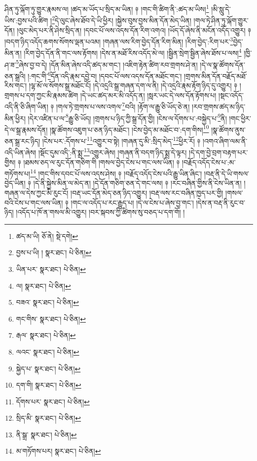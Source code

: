 ཤིན་ཏུ་ལྐོག་ཏུ་གྱུར་རྣམས་ལ། །ཚད་མ་ཡོད་པ་སྲིད་མ་ཡིན། ༈ །གང་གི་ཚིག་ནི་:ཚད་མ་ཡིས།\footnote{ཚད་མ་ཡི།  ཅོ་ནེ།  སྡེ་དགེ། } །མི་སླུ་དེ་ཡིས་:བྱས་པའི་ཚིག །\footnote{བྱས་པ་ཡི། །  སྣར་ཐང་།  པེ་ཅིན། }དེ་ལུང་ཞེས་ཐོབ་དེ་ཡི་ཕྱིར། །སྐྱེས་བུས་བྱས་མིན་དོན་མེད་ཡིན། །གལ་ཏེ་ཤིན་ཏུ་ལྐོག་གྱུར་དོན། །ལུང་མེད་པར་ནི་ཤེས་སྲིད་ན། །དབང་པོ་ལས་འདས་དོན་རིག་འགའ། །ཡོད་དོ་ཞེས་ནི་མངོན་འདོད་འགྱུར། ༈ །བདག་ཉིད་འདོད་ཆགས་སོགས་ལྡན་པའམ། །གཞན་ལས་རིག་བྱེད་དོན་རིག་མིན། །རིག་བྱེད་:རིག་པར་\footnote{ཡིན་པར་  སྣར་ཐང་།  པེ་ཅིན། }བྱེད་མིན་ན། །རིག་བྱེད་དོན་ནི་གང་ལས་རྟོགས། །དེས་ན་མཐོ་རིས་འདོད་མེ་ལ། །སྦྱིན་སྲེག་སྦྱིན་ཞེས་ཐོས་པ་ལས།\footnote{ལ།  སྣར་ཐང་།  པེ་ཅིན། } །ཁྱི་ཤ་ཟ་\footnote{བཟའ་  སྣར་ཐང་།  པེ་ཅིན། }ཞེས་བྱ་བ་དེ། །དོན་མིན་ཞེས་འདི་ཚད་མ་གང་། །འཇིག་རྟེན་ཚིག་རབ་གྲགས་ཤེ་ན། །དེ་ལ་སྣ་ཚོགས་དོན་ཅན་སྒྲའི། །:གང་གི་\footnote{གང་གིས་  སྣར་ཐང་།  པེ་ཅིན། }དོན་འདི་རྣམ་དབྱེ་བ། །དབང་པོ་ལས་འདས་དོན་མཐོང་གང་། །གྲགས་མིན་དོན་བརྗོད་མཐོ་རིས་གང་། །ལྷ་མོ་ལ་སོགས་སྒྲ་མཐོང་ངོ། །དེ་འདྲའི་སྒྲ་གཞན་དག་ལ་ནི། །དེ་འདྲའི་རྣམ་རྟོག་ཉིད་དུ་འགྱུར། ༈ །གྲགས་པ་དག་ཀྱང་མི་རྣམས་ཚིག །དེ་ཡང་ཚད་མར་མི་འདོད་ན། །སླར་ཡང་དེ་ལས་དོན་རྟོགས་པ། །སྡང་འདོད་འདི་ནི་ཅི་ཞིག་ཡིན། ༈ །གལ་ཏེ་གྲགས་པ་ལས་འགལ་\footnote{རྒལ་  སྣར་ཐང་།  པེ་ཅིན། }བའི། །རྟོག་ལ་རྒྱུ་ཅི་ཡོད་ཅེ་ན། །རབ་གྲགས་ཚད་མ་ཉིད་མིན་ཕྱིར། །དེར་འཛིན་པ་ལ་\footnote{ལའང་  སྣར་ཐང་།  པེ་ཅིན། }རྒྱུ་ཅི་ཡོད། །གྲགས་པ་ཉིད་ཀྱི་སྒྲ་དོན་གྱི། །ངེས་ལ་དོགས་པ་:བསྐྱེད་པ་\footnote{སྐྱེད་པ་  སྣར་ཐང་།  པེ་ཅིན། }ནི། །གང་ཕྱིར་དེ་ལ་སྒྲ་རྣམས་དོན། །སྣ་ཚོགས་འཇུག་པ་ཅན་ཉིད་མཐོང་། །ངེས་བྱེད་མ་མཐོང་བ་:དག་གིས།\footnote{དག་གི།  སྣར་ཐང་།  པེ་ཅིན། } །སྣ་ཚོགས་ནུས་ཅན་སྒྲ་རང་ཉིད། །ངེས་པར་:དོགས་པ་\footnote{དོགས་པར་  སྣར་ཐང་།  པེ་ཅིན། }འགྱུར་བ་སྟེ། །གཞན་དུ་མི་:སྲིད་མེད་\footnote{སྲིད་མི་  སྣར་ཐང་།  པེ་ཅིན། }ཕྱིར་རོ། ༈ །འགའ་ཞིག་ལམ་ནི་འདི་ཡིན་ཞེས། །སྡོང་དུམ་འདི་:ནི་སྨྲ་\footnote{ནི་སྒྲ་  སྣར་ཐང་།  པེ་ཅིན། }འགྱུར་ཞེས། །གཞན་ནི་བདག་ཉིད་སྨྲ་དེ་ལྟར། །དེ་དག་བྱེ་བྲག་བརྟག་པར་གྱིས། ༈ །ཐམས་ཅད་ལ་རུང་དོན་གཅིག་གི །གསལ་བྱེད་ངེས་པ་གང་ལས་ཡིན། ༈ །བརྗོད་འདོད་ངེས་པ་:མ་གཏོགས་པ།\footnote{མ་གཏོགས་པར།  སྣར་ཐང་།  པེ་ཅིན། } །གང་གིས་དབང་པོ་ལས་འདས་ཤེས། ༈ །བརྗོད་འདོད་ངེས་པའི་རྒྱུ་ཡིན་ཞིང་། །བརྡ་ནི་དེ་ཡི་གསལ་བྱེད་ཡིན། ༈ །དེ་ནི་སྐྱེས་མིན་ལ་མེད་ན། །དེ་དོན་གཅིག་ཅན་དེ་གང་ལས། ༈ །རང་བཞིན་གྱིས་ནི་ངེས་ཡིན་ན། །གཞན་ལ་དེས་ཀྱང་མི་རུང་ངོ། །བརྡ་ཡང་དོན་མེད་ཅན་ཉིད་འགྱུར། །བརྡ་ལས་རང་བཞིན་ཁྱད་པར་གྱི། །གསལ་བའི་ངེས་པ་གང་ལས་ཡིན། ༈ །གང་ལ་འདོད་པ་རང་རྒྱུད་པ། །དེ་ལ་ངེས་པ་ཞེས་བྱ་གང་། །དེས་ན་བརྡ་ནི་རུང་བ་ཉིད། །འདོད་པ་ཁོ་ན་གསལ་མི་འགྱུར། །བར་སྐབས་ཀྱི་ཚིགས་སུ་བཅད་པ་དག་གོ། །
